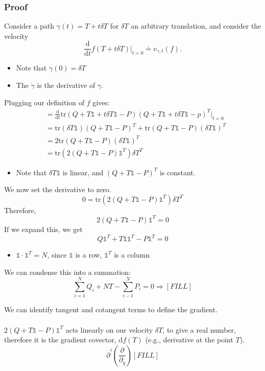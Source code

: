 \documentclass[10pt]{article}
\begin{document}
\subsubsection*{Proof}
Consider a path $\gamma(t) = T + t\delta T$ for $\delta T$ an arbitrary translation, and consider the velocity
\[\frac{\text{d}}{\text{d}t} f(T + t \delta T) \bigg|_{t = 0} \doteq v_{\gamma, t}(f).\]
\begin{itemize}
    \item Note that $\dot{\gamma}(0) = \delta T$
    \item The $\dot{\gamma}$ is the derivative of $\gamma$.
\end{itemize}
Plugging our definition of $f$ gives:
\begin{align*}
    &= \frac{\text{d}}{\text{d}t} \text{tr} (Q + T\mathds{1} + t\delta T\mathds{1} - P)(Q + T\mathds{1} + t \delta T\mathds{1} - p)^T \bigg|_{t=0}\\
    &= \text{tr}(\delta T\mathds{1})(Q + T\mathds{1} - P)^T + \text{tr}(Q + T\mathds{1} - P)(\delta T\mathds{1})^T\\
    &= 2 \text{tr} (Q + T\mathds{1} - P)(\delta T \mathds{1})^T\\
    &= \text{tr} (2(Q + T\mathds{1} - P) \mathds{1}^T) \delta T^T 
\end{align*}
\begin{itemize}
    \item Note that $\delta T\mathds{1}$ is linear, and $(Q + T\mathds{1} - P)^T$ is constant.
\end{itemize}
We now set the derivative to zero.
\[0 = \text{tr} (2(Q + T\mathds{1} - P) \mathds{1}^T) \delta T^T\]
Therefore,
\[2(Q + T\mathds{1} - P) \mathds{1}^T = 0\]
If we expand this, we get
\[Q \mathds{1}^T + T\mathds{1} \mathds{1}^T - P\mathds{1}^T = 0\]
\begin{itemize}
    \item $\mathds{1} \cdot \mathds{1}^T = N$, since $\mathds{1}$ is a row, $\mathds{1}^T$ is a column
\end{itemize}
We can condense this into a summation:
\[\sum_{i = 1}^N Q_i + NT - \sum_{i - 1}^N P_i = 0 \Longrightarrow [FILL]\]

We can identify tangent and cotangent terms to define the gradient.\\\\
$2(Q + T\mathds{1} - P)\mathds{1}^T$ acts linearly on our velocity $\delta T$, to give a real number, therefore it is the gradient covector, $\text{d}f (T)$  (e.g., derivative at the point $T$).
\[\dot{\partial}^i \left(\frac{\partial}{\partial_q}\right) [FILL]\]
\end{document}
